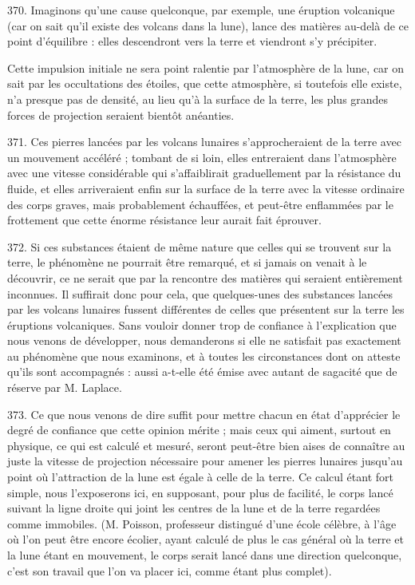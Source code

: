 \documentclass[a4paper, 11pt, oneside, polutonikogreek, french]{article}
\begin{document}
370. Imaginons qu'une cause quelconque, par exemple, une éruption volcanique (car on sait qu'il existe des volcans dans la lune), lance des matières au-delà de ce point d'équilibre : elles descendront vers la terre et viendront s'y précipiter.

Cette impulsion initiale ne sera point ralentie par l'atmosphère de la lune, car on sait par les occultations des étoiles, que cette atmosphère, si toutefois elle existe, n'a presque pas de densité, au lieu qu'à la surface de la terre, les plus grandes forces de projection seraient bientôt anéanties.

371. Ces pierres lancées par les volcans lunaires s'approcheraient de la terre avec un mouvement accéléré ; tombant de si loin, elles entreraient dans l'atmosphère avec une vitesse considérable qui s'affaiblirait graduellement par la résistance du fluide, et elles arriveraient enfin sur la surface de la terre avec la vitesse ordinaire des corps graves, mais probablement échauffées, et peut-être enflammées par le frottement que cette énorme résistance leur aurait fait éprouver.

372. Si ces substances étaient de même nature que celles qui se trouvent sur la terre, le phénomène ne pourrait être remarqué, et si jamais on venait à le découvrir, ce ne serait que par la rencontre des matières qui seraient entièrement inconnues. Il suffirait donc pour cela, que quelques-unes des substances lancées par les volcans lunaires fussent différentes de celles que présentent sur la terre les éruptions volcaniques. Sans vouloir donner trop de confiance à l'explication que nous venons de développer, nous demanderons si elle ne satisfait pas exactement au phénomène que nous examinons, et à toutes les circonstances dont on atteste qu'ils sont accompagnés : aussi a-t-elle été émise avec autant de sagacité que de réserve par M. Laplace.

373. Ce que nous venons de dire suffit pour mettre chacun en état d'apprécier le degré de confiance que cette opinion mérite ; mais ceux qui aiment, surtout en physique, ce qui est calculé et mesuré, seront peut-être bien aises de connaître au juste la vitesse de projection nécessaire pour amener les pierres lunaires jusqu'au point où l'attraction de la lune est égale à celle de la terre. Ce calcul étant fort simple, nous l'exposerons ici, en supposant, pour plus de facilité, le corps lancé suivant la ligne droite qui joint les centres de la lune et de la terre regardées comme immobiles. (M. Poisson, professeur distingué d'une école célèbre, à l'âge où l'on peut être encore écolier, ayant calculé de plus le cas général où la terre et la lune étant en mouvement, le corps serait lancé dans une direction quelconque, c'est son travail que l'on va placer ici, comme étant plus complet).
\end{document}
